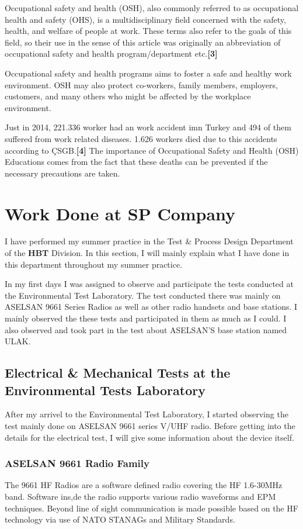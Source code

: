 	Occupational safety and health (OSH), also commonly referred to as occupational health and safety (OHS), is a multidisciplinary field concerned with the safety, health, and welfare of people at work. These terms also refer to the goals of this field, so their use in the sense of this article was originally an abbreviation of occupational safety and health program/department etc.\textbf{[3]}

	Occupational safety and health programs aims to foster a safe and healthy work environment. OSH may also protect co-workers, family members, employers, customers, and many others who might be affected by the workplace environment. 

	Just in 2014, 221.336 worker had an work accident imn Turkey and 494 of them suffered from work related diseases. 1.626 workers died due to this accidents according to ÇSGB.\textbf{[4]} The importance of Occupational Safety and Health (OSH) Educations comes from the fact that these deaths can be prevented if the necessary precautions are taken.

\section{Work Done at SP Company}
\- \indent
	I have performed my summer practice in the Test \& Process Design Department of the \textbf{HBT} Division. In this section, I will mainly explain what I have done in this department throughout my summer practice.
	 
	In my first days I was assigned to observe and participate the tests conducted at the Environmental   Test Laboratory. The test conducted there was mainly on ASELSAN 9661 Series Radios as well as other radio handsets and base stations. I mainly observed the these tests and participated in them as much as I could. I also observed and took part in the test about ASELSAN'S base station named ULAK. 

\subsection{Electrical \& Mechanical Tests at the Environmental Tests Laboratory  }
\- \indent
	After my arrivel to the Environmental Test Laboratory, I started observing the test mainly done on ASELSAN 9661 series V/UHF radio. Before getting into the details for the electrical test, I will give some information about the device itself.   
	
\subsubsection{ASELSAN 9661 Radio Family}
\- \indent	
	The 9661 HF Radios are a software defined radio covering the HF 1.6-30MHz band. Software ins,de the radio supports various radio waveforms and EPM techniques. Beyond line of sight communication is made possible based on the HF technology via use of NATO STANAGs and Military Standards\cite{9661}. 


